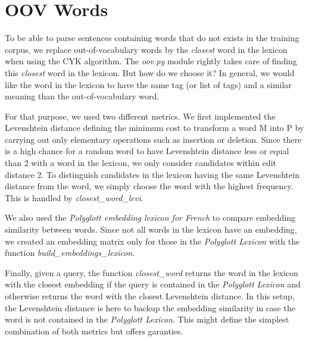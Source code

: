 \documentclass[10pt,twocolumn,letterpaper]{article}
\begin{document}
\section{OOV Words}
To be able to parse sentences containing words that do not exists in the training corpus, we replace out-of-vocabulary words by the \textit{closest} word in the lexicon when using the CYK algorithm. The \textit{oov.py} module rightly takes care of finding this \textit{closest} word in the lexicon. But how do we choose it? In general, we would like the word in the lexicon to have the same tag (or list of tags) and a similar meaning than the out-of-vocabulary word.\par
For that purpose, we used two different metrics. We first implemented the Levenshtein distance defining the minimum cost to transform a word M into P by carrying out only elementary operations such as insertion or deletion. Since there is a high chance for a random word to have Levenshtein distance less or equal than 2 with a word in the lexicon, we only consider candidates within edit distance 2. To distinguish candidates in the lexicon having the same Levenshtein distance from the word, we simply choose the word with the highest frequency. This is handled by \textit{closest\_word\_levi}.\par
We also used the \textit{Polyglott embedding lexicon for French} to compare embedding similarity between words. Since not all words in the lexicon have an embedding, we created an embedding matrix only for those in the \textit{Polyglott Lexicon} with the function \textit{build\_embeddings\_lexicon}.\par
Finally, given a query, the function \textit{closest\_word} returns the word in the lexicon with the closest embedding if the query is contained in the \textit{Polyglott Lexicon} and otherwise returns the word with the closest Levenshtein distance. In this setup, the Levenshtein distance is here to backup the embedding similarity in case the word is not contained in the \textit{Polyglott Lexicon}. This might define the simplest combination of both metrics but offers garanties.
\end{document}
